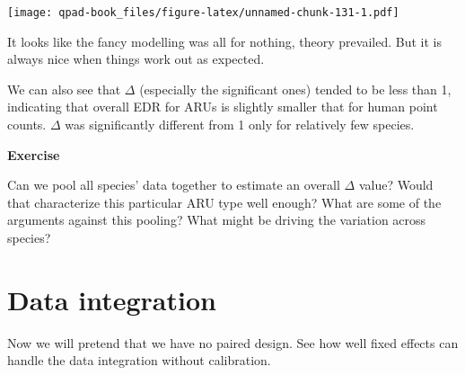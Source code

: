 \documentclass[12pt,]{book}
\let\BeginKnitrBlock\begin \let\EndKnitrBlock\end
\begin{document}
\texttt{[image: qpad-book\_files/figure-latex/unnamed-chunk-131-1.pdf]}

It looks like the fancy modelling was all for nothing,
theory prevailed. But it is always nice when things work out
as expected.

We can also see that \(\Delta\) (especially the significant ones)
tended to be less than 1, indicating that overall EDR for ARUs
is slightly smaller that for human point counts. \(\Delta\)
was significantly different from 1 only for relatively few species.

\BeginKnitrBlock{rmdexercise}
\textbf{Exercise}

Can we pool all species' data together to estimate an overall \(\Delta\)
value? Would that characterize this particular ARU type well enough?
What are some of the arguments against this pooling? What might be
driving the variation across species?
\EndKnitrBlock{rmdexercise}

\hypertarget{data-integration}{%
\section{Data integration}\label{data-integration}}

Now we will pretend that we have no paired design. See how well
fixed effects can handle the data integration without calibration.
\end{document}
